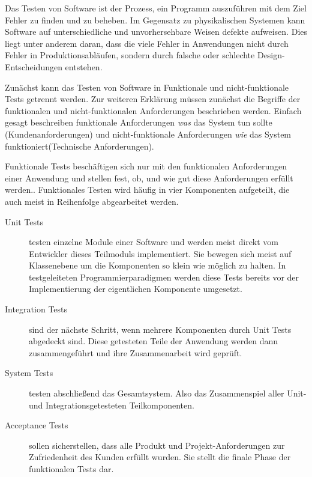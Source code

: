 \documentclass[12pt,a4paper,bibliography=totocnumbered,listof=totocnumbered]{scrartcl}
\begin{document}
Das Testen von Software ist der Prozess, ein Programm auszuführen mit dem Ziel Fehler zu finden und zu beheben. Im Gegensatz zu physikalischen Systemen kann Software auf unterschiedliche und unvorhersehbare Weisen defekte aufweisen.\cite{pantesting} Dies liegt unter anderem daran, dass die viele Fehler in Anwendungen nicht durch Fehler in Produktionsabläufen, sondern durch falsche oder schlechte Design-Entscheidungen entstehen.\cite{pantesting}

Zunächst kann das Testen von Software in Funktionale und nicht-funktionale Tests getrennt werden. Zur weiteren Erklärung müssen zunächst die Begriffe der funktionalen und nicht-funktionalen Anforderungen beschrieben werden. Einfach gesagt beschreiben funktionale Anforderungen \textit{was} das System tun sollte (Kundenanforderungen) und nicht-funktionale Anforderungen \textit{wie} das System funktioniert(Technische Anforderungen).\cite{erikssonreq} 


Funktionale Tests beschäftigen sich nur mit den funktionalen Anforderungen einer Anwendung und stellen fest, ob, und wie gut diese Anforderungen erfüllt werden.\cite{erikssontesting}. Funktionales Testen wird häufig in vier Komponenten aufgeteilt, die auch meist in Reihenfolge abgearbeitet werden.\cite{inflectra}

\begin{description}
	\item[Unit Tests] testen einzelne Module einer Software und werden meist direkt vom Entwickler dieses Teilmoduls implementiert. Sie bewegen sich meist auf Klassenebene um die Komponenten so klein  wie möglich zu halten. In testgeleiteten Programmierparadigmen werden diese Tests bereits vor der Implementierung der eigentlichen Komponente umgesetzt.\cite{inflectra}
	\item[Integration Tests] sind der nächste Schritt, wenn mehrere Komponenten durch Unit Tests abgedeckt sind. Diese getesteten Teile der Anwendung werden dann zusammengeführt und ihre Zusammenarbeit wird geprüft.\cite{inflectra}
	\item[System Tests] testen abschließend das Gesamtsystem. Also das Zusammenspiel aller Unit- und Integrationsgetesteten Teilkomponenten.\cite{inflectra}
	\item[Acceptance Tests] sollen sicherstellen, dass alle Produkt und Projekt-Anforderungen zur Zufriedenheit des Kunden erfüllt wurden. Sie stellt die finale Phase der funktionalen Tests dar.\cite{inflectra}
\end{description}
\end{document}

